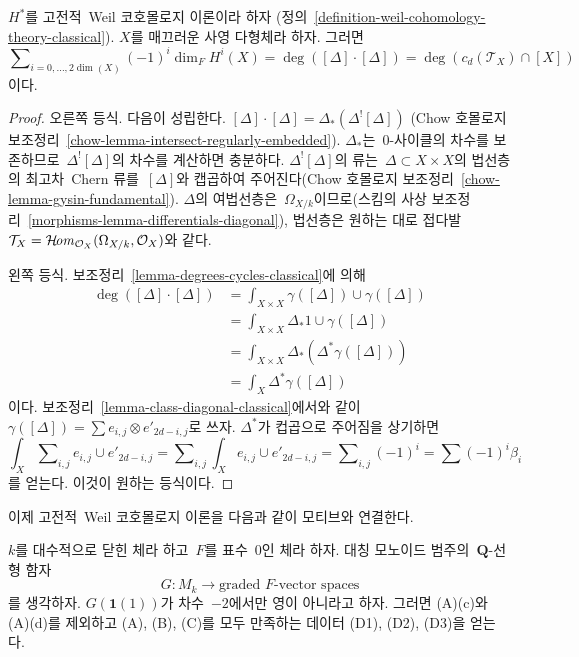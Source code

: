 \begin{lemma}
\label{lemma-square-diagonal-classical}
$H^*$를 고전적\  Weil 코호몰로지 이론이라 하자
(정의\  \ref{definition-weil-cohomology-theory-classical}).
$X$를 매끄러운 사영 다형체라 하자. 그러면
$$
\sum\nolimits_{i = 0, \ldots, 2\dim(X)} (-1)^i\dim_F H^i(X) =
\deg([\Delta] \cdot [\Delta]) = \deg(c_d(\mathcal{T}_X) \cap [X])
$$
이다.
\end{lemma}

\begin{proof}
오른쪽 등식. 다음이 성립한다.
$[\Delta] \cdot [\Delta] = \Delta_*(\Delta^![\Delta])$
(Chow 호몰로지 보조정리\ 
\ref{chow-lemma-intersect-regularly-embedded}).
$\Delta_*$는\  $0$-사이클의 차수를 보존하므로\ 
$\Delta^![\Delta]$의 차수를 계산하면 충분하다.
$\Delta^![\Delta]$의 류는\ 
$\Delta \subset X \times X$의 법선층의 최고차\  Chern 류를\ 
$[\Delta]$와 캡곱하여 주어진다(Chow 호몰로지 보조정리\ 
\ref{chow-lemma-gysin-fundamental}). $\Delta$의 여법선층은\ 
$\Omega_{X/k}$이므로(스킴의 사상 보조정리\ 
\ref{morphisms-lemma-differentials-diagonal}), 법선층은 원하는 대로
접다발\ 
$\mathcal{T}_X = \mathop{\mathcal{H}\!\mathit{om}}\nolimits_{\mathcal{O}_X}(\Omega_{X/k}, \mathcal{O}_X)$와
같다.

\medskip\noindent
왼쪽 등식. 보조정리\  \ref{lemma-degrees-cycles-classical}에 의해
\begin{align*}
\deg([\Delta] \cdot [\Delta])
& =
\int_{X \times X} \gamma([\Delta]) \cup \gamma([\Delta]) \\
& =
\int_{X \times X} \Delta_*1 \cup \gamma([\Delta]) \\
& =
\int_{X \times X} \Delta_*(\Delta^*\gamma([\Delta])) \\
& =
\int_X \Delta^*\gamma([\Delta])
\end{align*}
이다. 보조정리\  \ref{lemma-class-diagonal-classical}에서와 같이\ 
$\gamma([\Delta]) = \sum  e_{i, j} \otimes e'_{2d - i , j}$로 쓰자.
$\Delta^*$가 컵곱으로 주어짐을 상기하면
$$
\int_X \sum\nolimits_{i, j} e_{i, j} \cup e'_{2d - i, j} =
\sum\nolimits_{i, j} \int_X e_{i, j} \cup e'_{2d - i, j} =
\sum\nolimits_{i, j} (-1)^i = \sum (-1)^i\beta_i
$$
를 얻는다. 이것이 원하는 등식이다.
\end{proof}




\noindent
이제 고전적\  Weil 코호몰로지 이론을 다음과 같이 모티브와 연결한다.

\begin{lemma}
\label{lemma-from-functor-to-weil-classical}
$k$를 대수적으로 닫힌 체라 하고\  $F$를 표수\  $0$인 체라 하자.
대칭 모노이드 범주의\  $\mathbf{Q}$-선형 함자
$$
G : M_k \longrightarrow \text{graded }F\text{-vector spaces}
$$
를 생각하자. $G(\mathbf{1}(1))$가 차수\  $-2$에서만 영이 아니라고 하자.
그러면 (A)(c)와 (A)(d)를 제외하고 (A), (B), (C)를 모두 만족하는
데이터 (D1), (D2), (D3)을 얻는다.
\end{lemma}

